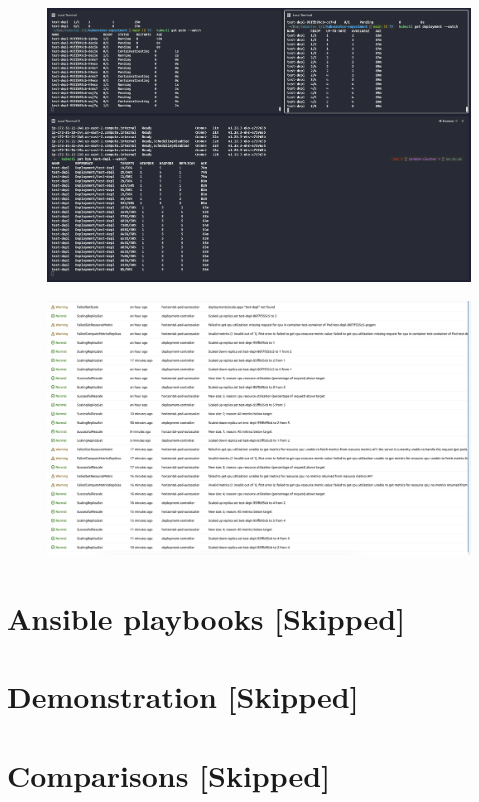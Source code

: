 \documentclass{article}
\begin{document}
\begin{figure}[H]
    \centering
    \includegraphics[width=0.9\linewidth]{images/exp3_watch.png}
\end{figure}
\begin{figure}[H]
    \centering
    \includegraphics[width=0.9\linewidth]{images/autoscaler_events.png}
\end{figure}
\newpage
\section{Ansible playbooks \color{red}[Skipped]}
\section{Demonstration \color{red}[Skipped]}
\section{Comparisons \color{red}[Skipped]}
\newpage
\end{document}
